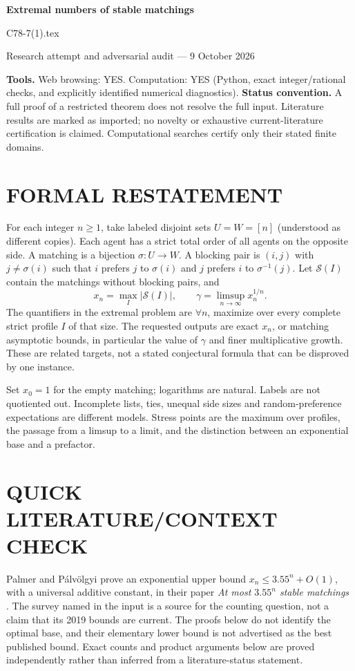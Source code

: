 \documentclass[11pt,a4paper]{article}
\theoremstyle{remark}\newtheorem{remark}[theorem]{Remark}
\begin{document}
\begin{center}
{\LARGE\bfseries Extremal numbers of stable matchings}\par\medskip
{\large C78-7(1).tex}\par
Research attempt and adversarial audit --- 9 October 2026
\end{center}
\label{problem:OP-0553}
\label{beyond:MM-12}
\textbf{Tools.} Web browsing: YES. Computation: YES (Python, exact integer/rational checks, and explicitly identified numerical diagnostics).
\textbf{Status convention.} A full proof of a restricted theorem does not resolve the full input. Literature results are marked as imported; no novelty or exhaustive current-literature certification is claimed. Computational searches certify only their stated finite domains.

\section{FORMAL RESTATEMENT}
For each integer $n\ge1$, take labeled disjoint sets $U=W=[n]$ (understood as different copies). Each agent has a strict total order of all agents on the opposite side. A matching is a bijection $\sigma:U\to W$. A blocking pair is $(i,j)$ with $j\ne\sigma(i)$ such that $i$ prefers $j$ to $\sigma(i)$ and $j$ prefers $i$ to $\sigma^{-1}(j)$. Let $\mathcal S(I)$ contain the matchings without blocking pairs, and
\[
x_n=\max_I|\mathcal S(I)|,\qquad \gamma=\limsup_{n\to\infty}x_n^{1/n}.
\]
The quantifiers in the extremal problem are $\forall n$, maximize over every complete strict profile $I$ of that size. The requested outputs are exact $x_n$, or matching asymptotic bounds, in particular the value of $\gamma$ and finer multiplicative growth. These are related targets, not a stated conjectural formula that can be disproved by one instance.

Set $x_0=1$ for the empty matching; logarithms are natural. Labels are not quotiented out. Incomplete lists, ties, unequal side sizes and random-preference expectations are different models. Stress points are the maximum over profiles, the passage from a limsup to a limit, and the distinction between an exponential base and a prefactor.

\section{QUICK LITERATURE/CONTEXT CHECK}
Palmer and P\'alv\"olgyi prove an exponential upper bound $x_n\le 3.55^n+O(1)$, with a universal additive constant, in their paper \emph{At most $3.55^n$ stable matchings} \cite{pp}. The survey named in the input is a source for the counting question, not a claim that its 2019 bounds are current. The proofs below do not identify the optimal base, and their elementary lower bound is not advertised as the best published bound. Exact counts and product arguments below are proved independently rather than inferred from a literature-status statement.
\end{document}
